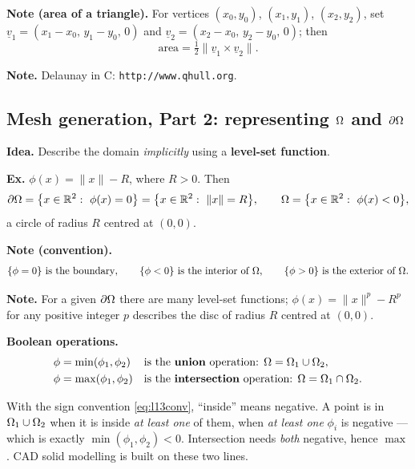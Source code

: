 \medskip\noindent
\textbf{Note (area of a triangle).} For vertices $(x_{0},y_{0})$,
$(x_{1},y_{1})$, $(x_{2},y_{2})$, set
$\underline{v}_{1}=(x_{1}-x_{0},\,y_{1}-y_{0},\,0)$ and
$\underline{v}_{2}=(x_{2}-x_{0},\,y_{2}-y_{0},\,0)$; then
\begin{equation}\label{eq:l13area}
  \text{area}=\tfrac12\bigl\|\underline{v}_{1}\times\underline{v}_{2}\bigr\| .
\end{equation}

\medskip\noindent
\textbf{Note.} Delaunay in C: \texttt{http://www.qhull.org}.

\subsection*{Mesh generation, Part 2: representing $\Omega$ and $\partial\Omega$}

\textbf{Idea.} Describe the domain \emph{implicitly} using a \textbf{level-set
function}.

\medskip\noindent
\textbf{Ex.} $\phi(x)=\|x\|-R$, where $R>0$. Then
\begin{equation}\label{eq:l13levelset}
  \partial\Omega=\bigl\{x\in\mathbb{R}^{2}:\ \phi(x)=0\bigr\}
      =\bigl\{x\in\mathbb{R}^{2}:\ \|x\|=R\bigr\},
  \qquad
  \Omega=\bigl\{x\in\mathbb{R}^{2}:\ \phi(x)<0\bigr\},
\end{equation}
a circle of radius $R$ centred at $(0,0)$.

\medskip\noindent
\textbf{Note (convention).}
\begin{equation}\label{eq:l13conv}
  \{\phi=0\}\ \text{is the boundary},\qquad
  \{\phi<0\}\ \text{is the interior of } \Omega,\qquad
  \{\phi>0\}\ \text{is the exterior of } \Omega .
\end{equation}

\medskip\noindent
\textbf{Note.} For a given $\partial\Omega$ there are many level-set functions; \eg
$\phi(x)=\|x\|^{p}-R^{p}$ for any positive integer $p$ describes the disc of
radius $R$ centred at $(0,0)$.

\medskip\noindent
\textbf{Boolean operations.}
\begin{align}
  \phi&=\min(\phi_{1},\phi_{2}) &&\text{is the \textbf{union} operation: }
    \Omega=\Omega_{1}\cup\Omega_{2},\label{eq:l13union}\\
  \phi&=\max(\phi_{1},\phi_{2}) &&\text{is the \textbf{intersection}
    operation: } \Omega=\Omega_{1}\cap\Omega_{2}.\label{eq:l13inter}
\end{align}

\begin{intuition}
With the sign convention \eqref{eq:l13conv}, ``inside'' means negative. A point
is in $\Omega_{1}\cup\Omega_{2}$ when it is inside \emph{at least one} of them, \ie
when \emph{at least one} $\phi_{i}$ is negative --- which is exactly
$\min(\phi_{1},\phi_{2})<0$. Intersection needs \emph{both} negative, hence
$\max$. CAD solid modelling is built on these two lines.
\end{intuition}

